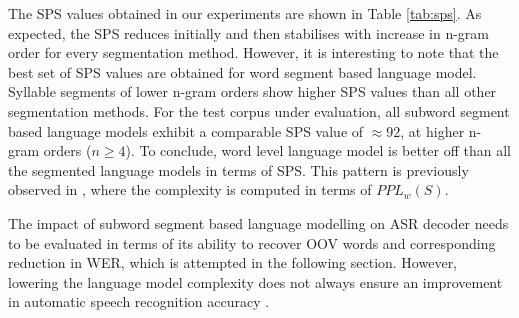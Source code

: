 


The SPS values obtained in our experiments are shown in Table \ref{tab:sps}. As
expected, the SPS reduces initially and then stabilises with increase in n-gram
order for every segmentation method. However, it is interesting to note that
the best set of SPS values are obtained for word segment based language model.
Syllable segments of lower n-gram orders show higher SPS values than all other
segmentation methods. For the test corpus under evaluation, all subword segment
based language models exhibit a comparable SPS value of $\approx 92$, at higher
n-gram orders ($n\ge4$). To conclude, word level language model is better off
than all the segmented language models in terms of SPS. This pattern is
previously observed in \cite{SMIT2021101158}, where the complexity is computed
in terms of $PPL_w(S)$.

The impact of subword segment based language modelling on ASR decoder needs to
be evaluated in terms of its ability to recover OOV words and corresponding
reduction in WER, which is attempted in the following section. However,
lowering the language model complexity does not always ensure an improvement in
automatic speech recognition accuracy
\cite{SMIT2021101158,klosowski2017statistical}.

